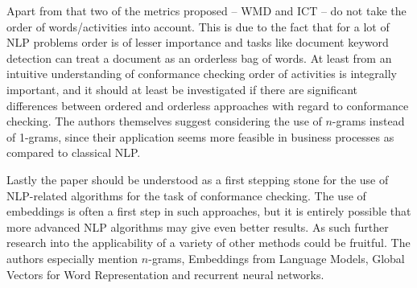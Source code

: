 \documentclass[runningheads]{template/llncs}
\begin{document}
Apart from that two of the metrics proposed -- WMD and ICT -- do not take the order of words/activities into account.
This is due to the fact that for a lot of NLP problems order is of lesser importance and tasks like document keyword detection can treat a document as an orderless bag of words.
At least from an intuitive understanding of conformance checking order of activities is integrally important, and it should at least be investigated if there are significant differences between ordered and orderless approaches with regard to conformance checking.
The authors themselves suggest considering the use of $n$-grams instead of 1-grams, since their application seems more feasible in business processes as compared to classical NLP.

Lastly the paper should be understood as a first stepping stone for the use of NLP-related algorithms for the task of conformance checking.
The use of embeddings is often a first step in such approaches, but it is entirely possible that more advanced NLP algorithms may give even better results.
As such further research into the applicability of a variety of other methods could be fruitful.
The authors especially mention $n$-grams, Embeddings from Language Models, Global Vectors for Word Representation and recurrent neural networks.

%
%
%


%
\end{document}
